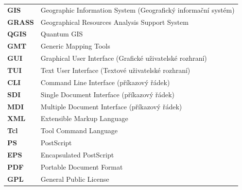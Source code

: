 \documentclass[a4paper,12pt,draft]{article}
\begin{document}
\begin{tabular}{ll}
\textbf{GIS}& Geographic Information System (Geografický informační systém)\\
\textbf{GRASS}& Geographical Resources Analysis Support System\\
\textbf{QGIS}& Quantum GIS\\
\textbf{GMT}& Generic Mapping Tools\\
\textbf{GUI}& Graphical User Interface (Grafické uživatelské rozhraní)\\
\textbf{TUI}& Text User Interface (Textové uživatelské rozhraní)\\
\textbf{CLI}& Command Line Interface (příkazový řádek)\\
\textbf{SDI}& Single Document Interface (příkazový řádek)\\
\textbf{MDI}& Multiple Document Interface (příkazový řádek)\\
\textbf{XML}& Extensible Markup Language\\
\textbf{Tcl}& Tool Command Language\\
\textbf{PS}& PostScript\\
\textbf{EPS}& Encapsulated PostScript\\
\textbf{PDF}& Portable Document Format\\
\textbf{GPL}& General Public License\\

\end{tabular}
\fi
\end{document}
